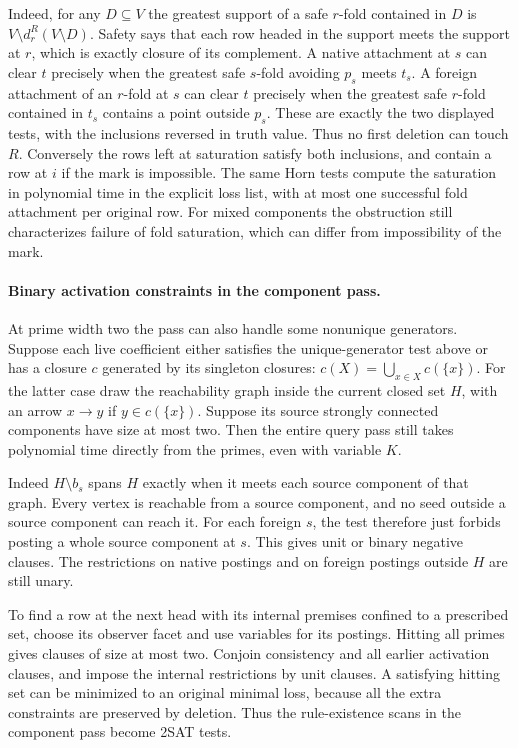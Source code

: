 Indeed, for any $D\subseteq V$ the greatest support of a safe
$r$-fold contained in $D$ is $V\setminus d_r^R(V\setminus D)$.
Safety says that each row headed in the support meets the support
at $r$, which is exactly closure of its complement. A native
attachment at $s$ can clear $t$ precisely when the greatest safe
$s$-fold avoiding $p_s$ meets $t_s$. A foreign attachment of an
$r$-fold at $s$ can clear $t$ precisely when the greatest safe
$r$-fold contained in $t_s$ contains a point outside $p_s$.
These are exactly the two displayed tests, with the inclusions
reversed in truth value. Thus no first deletion can touch $R$.
Conversely the rows left at saturation satisfy both inclusions,
and contain a row at $i$ if the mark is impossible. The same
Horn tests compute the saturation in polynomial time in the
explicit loss list, with at most one successful fold attachment
per original row. For mixed components the obstruction still
characterizes failure of fold saturation, which can differ from
impossibility of the mark.

\paragraph{Binary activation constraints in the component pass.}
At prime width two the pass can also handle some
nonunique generators. Suppose each live coefficient
either satisfies the unique-generator test above or
has a closure $c$ generated by its singleton closures:
$c(X)=\bigcup_{x\in X}c(\{x\})$. For the latter case draw
the reachability graph inside the current closed set
$H$, with an arrow $x\to y$ if $y\in c(\{x\})$.
Suppose its source strongly connected components have
size at most two. Then the entire query pass still
takes polynomial time directly from the primes, even
with variable $K$.

Indeed $H\setminus b_s$ spans $H$ exactly when it
meets each source component of that graph. Every
vertex is reachable from a source component, and no
seed outside a source component can reach it. For
each foreign $s$, the test therefore just forbids
posting a whole source component at $s$. This gives
unit or binary negative clauses. The restrictions on
native postings and on foreign postings outside $H$
are still unary.

To find a row at the next head with its internal
premises confined to a prescribed set, choose its
observer facet and use variables for its postings.
Hitting all primes gives clauses of size at most
two. Conjoin consistency and all earlier activation
clauses, and impose the internal restrictions by
unit clauses. A satisfying hitting set can be
minimized to an original minimal loss, because all
the extra constraints are preserved by deletion.
Thus the rule-existence scans in the component pass
become 2SAT tests.

